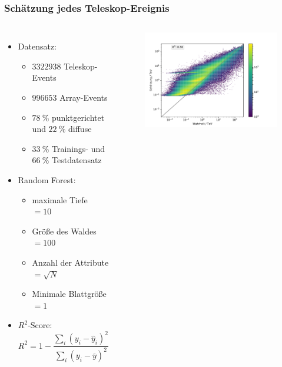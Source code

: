\documentclass[aspectratio=1610, professionalfonts, 9pt]{beamer}
\begin{document}
  \begin{frame}
    \frametitle{Schätzung jedes Teleskop-Ereignis}
    \begin{columns}
        \begin{itemize}
          \item Datensatz:
            \begin{itemize}
              \item $\num{3322938}$ Teleskop-Events
              \item $\num{996653}$ Array-Events
              \item $\SI{78}{\percent}$ punktgerichtet und $\SI{22}{\percent}$ diffuse
              \item $\SI{33}{\percent}$ Trainings- und $\SI{66}{\percent}$ Testdatensatz
            \end{itemize}
          \item Random Forest:
            \begin{itemize}
              \item maximale Tiefe $=\num{10}$
              \item Größe des Waldes $=\num{100}$
              \item Anzahl der Attribute $=\sqrt{N}$
              \item Minimale Blattgröße $=\num{1}$
            \end{itemize}
          \item $R^2$-Score:
          \begin{equation*}
            R^2 = 1 - \frac{\sum_i (y_i-\hat{y}_i)^2}{\sum_i (y_i - \overline{y})^2}
          \end{equation*}
        \end{itemize}
      \begin{figure}
        \includegraphics[width=1.1\textwidth]{pictures/RF.pdf}
        \caption{}
        \label{}
      \end{figure}
    \end{columns}
  \end{frame}
\end{document}
